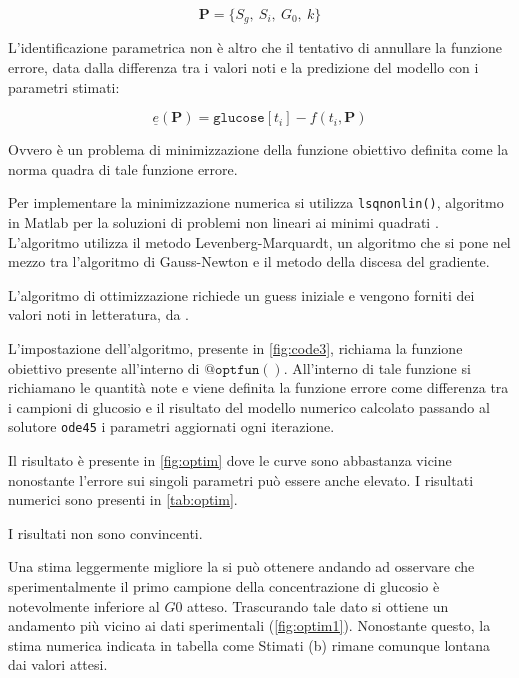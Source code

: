 \begin{equation}
	\mathbf{P}=\{S_g,\:S_i,\:G_0,\:k\}
\end{equation}

L'identificazione parametrica non è altro che il tentativo di annullare la funzione errore, data dalla differenza tra i valori noti e la predizione del modello con i parametri stimati:

\begin{equation}
	\underline{e}\left(\mathbf{P}\right)=\mathtt{glucose}[t_i]-f(t_i,\mathbf{P})
\end{equation}

Ovvero è un problema di minimizzazione della funzione obiettivo definita come la norma quadra di tale funzione errore.

Per implementare la minimizzazione numerica si utilizza \texttt{lsqnonlin()}, algoritmo in Matlab per la soluzioni di problemi non lineari ai minimi quadrati \cite{lsqnonlin}. L'algoritmo utilizza il metodo Levenberg-Marquardt, un algoritmo che si pone nel mezzo tra l'algoritmo di Gauss-Newton e il metodo della discesa del gradiente.

L'algoritmo di ottimizzazione richiede un guess iniziale e vengono forniti dei valori noti in letteratura, da \citeauthor{pacini_minmod_1986} \cite{pacini_minmod_1986}.

L'impostazione dell'algoritmo, presente in \cref{fig:code3}, richiama la funzione obiettivo presente all'interno di $\mathtt{@optfun()}$. All'interno di tale funzione si richiamano le quantità note e viene definita la funzione errore come differenza tra i campioni di glucosio e il risultato del modello numerico calcolato passando al solutore \texttt{ode45} i parametri aggiornati ogni iterazione.

Il risultato è presente in \cref{fig:optim} dove le curve sono abbastanza vicine nonostante l'errore sui singoli parametri può essere anche elevato. I risultati numerici sono presenti in \cref{tab:optim}.

I risultati non sono convincenti.

Una stima leggermente migliore la si può ottenere andando ad osservare che sperimentalmente il primo campione della concentrazione di glucosio è notevolmente inferiore al $G0$ atteso. Trascurando tale dato si ottiene un andamento più vicino ai dati sperimentali (\cref{fig:optim1}). Nonostante questo, la stima numerica indicata in tabella come Stimati (b) rimane comunque lontana dai valori attesi.




